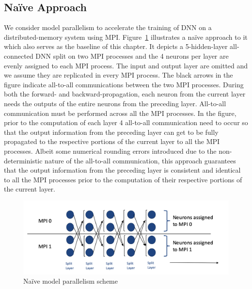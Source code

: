 \subsection{Na\"{i}ve Approach}
We consider model parallelism to accelerate the training of DNN on a
distributed-memory system using MPI. Figure~\ref{fig:altsplit_baseline}
illustrates a na\"{i}ve approach to it which also serves as the baseline of
this chapter. It depicts a 5-hidden-layer all-connected DNN split on two MPI
processes and the 4 neurons per layer are evenly assigned to each MPI
process. The input and output layer are omitted and we assume they are
replicated in every MPI process. The black arrows in the figure indicate
all-to-all communications between the two MPI processes. During both the
forward- and backward-propagation, each neuron from the current layer needs
the outputs of the entire neurons from the preceding layer. All-to-all
communication must be performed across all the MPI processes. In the figure,
prior to the computation of each layer 4 all-to-all communication need to
occur so that the output information from the preceding layer can get to be
fully propagated to the respective portions of the current layer to all the
MPI processes. Albeit some numerical rounding errors introduced due to the
non-deterministic nature of the all-to-all communication, this approach
guarantees that the output information from the preceding layer is consistent
and identical to all the MPI processes prior to the computation of their
respective portions of the current layer.
\begin{figure}[H]
    \centerline{\includegraphics[scale=0.60]{altsplit/figs/baseline.png}}
    \caption{Na\"{i}ve model parallelism scheme}
    \label{fig:altsplit_baseline}
\end{figure}

